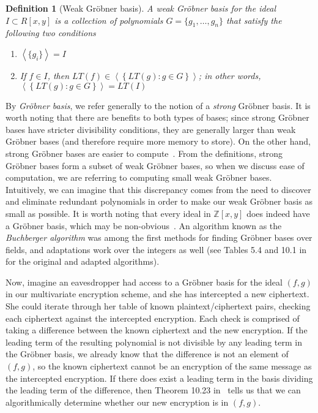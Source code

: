 \documentclass[11pt]{report}
\newtheorem{definition}{Definition}
\newcommand{\Zxy}{\mathbb{Z}[x,y]}
\begin{document}
\begin{definition}[Weak Gr\"obner basis]
A \emph{weak Gr\"obner basis} for the ideal $I\subset R[x,y]$ is a collection of polynomials $G=\{g_1,\dots,g_n\}$ that satisfy the following two conditions
\begin{enumerate}
\item $\left\langle\{g_i\}\right\rangle = I$
\item If $f\in I$, then $LT(f) \in \left\langle \left\{ LT(g) : g\in G\right\} \right\rangle$; in other words, $\left\langle \left\{ LT(g) : g\in G\right\} \right\rangle = LT(I)$
\end{enumerate}
\end{definition}

By \emph{Gr\"obner basis}, we refer generally to the notion of a \emph{strong} Gr\"obner basis. It is worth noting that there are benefits to both types of bases; since strong Gr\"obner bases have stricter divisibility conditions, they are generally larger than weak Gr\"obner bases (and therefore require more memory to store). On the other hand, strong Gr\"obner bases are easier to compute~\cite{stillman-conv}. From the definitions, strong Gr\"obner bases form a subset of weak Gr\"obner bases, so when we discuss ease of computation, we are referring to computing small weak Gr\"obner bases. Intuitively, we can imagine that this discrepancy comes from the need to discover and eliminate redundant polynomials in order to make our weak Gr\"obner basis as small as possible. It is worth noting that every ideal in $\Zxy$ does indeed have a Gr\"obner basis, which may be non-obvious~\cite{becker}. An algorithm known as the \emph{Buchberger algorithm} was among the first methods for finding Gr\"obner bases over fields, and adaptations work over the integers as well (see Tables 5.4 and 10.1 in~\cite{becker} for the original and adapted algorithms).

Now, imagine an eavesdropper had access to a Gr\"obner basis for the ideal $(f,g)$ in our multivariate encryption scheme, and she has intercepted a new ciphertext. She could iterate through her table of known plaintext/ciphertext pairs, checking each ciphertext against the intercepted encryption. Each check is comprised of taking a difference between the known ciphertext and the new encryption. If the leading term of the resulting polynomial is not divisible by any leading term in the Gr\"obner basis, we already know that the difference is not an element of $(f,g)$, so the known ciphertext cannot be an encryption of the same message as the intercepted encryption. If there does exist a leading term in the basis dividing the leading term of the difference, then Theorem 10.23 in~\cite{becker} tells us that we can algorithmically determine whether our new encryption is in $(f,g)$.
\end{document}
